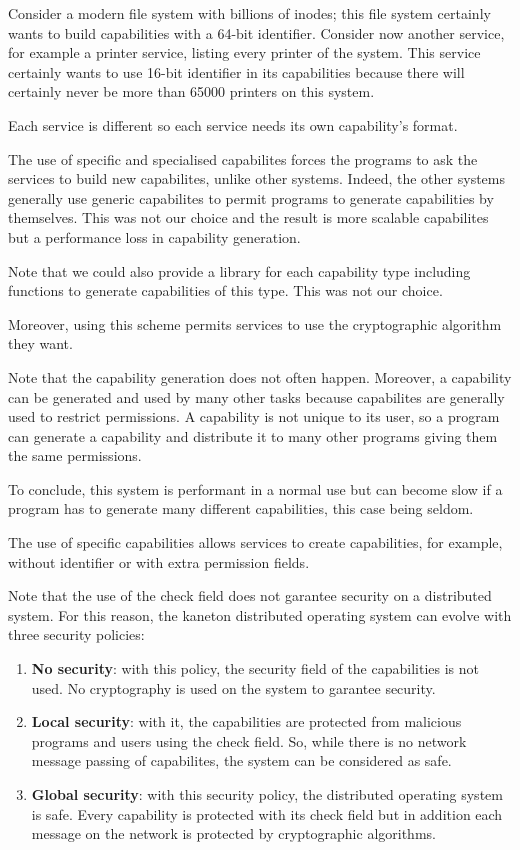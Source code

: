 \begin{multicols}{2}
Consider a modern file system with billions of inodes; this file system
certainly wants to build capabilities with a 64-bit identifier.
Consider now another service, for example a printer service, listing
every printer of the system. This service certainly wants to use 16-bit
identifier in its capabilities because there will certainly never be more than
65000 printers on this system.

Each service is different so each service needs its own capability's format.

The use of specific and specialised capabilites forces the programs to ask
the services to build new capabilites, unlike other systems. Indeed,
the other systems generally use generic capabilites to permit programs to
generate capabilities by themselves. This was not our choice and the result is
more scalable capabilites but a performance loss in capability generation.

Note that we could also provide a library for each capability type including
functions to generate capabilities of this type. This was not our choice.

Moreover, using this scheme permits services to use the cryptographic algorithm
they want.

Note that the capability generation does not often happen. Moreover,
a capability can be generated and used by many other tasks because
capabilites are generally used to restrict permissions. A capability
is not unique to its user, so a program can generate a capability and
distribute it to many other programs giving them the same permissions.

To conclude, this system is performant in a normal use but can become
slow if a program has to generate many different capabilities, this case
being seldom.

The use of specific capabilities allows services to create capabilities,
for example, without identifier or with extra permission fields.

Note that the use of the check field does not garantee security on a
distributed system. For this reason, the kaneton distributed operating
system can evolve with three security policies:

\begin{enumerate}
  \item
    \textbf{No security}: with this policy, the security field of the
    capabilities is not used. No cryptography is used on the system
    to garantee security.
  \item
    \textbf{Local security}: with it, the capabilities are protected from
    malicious programs and users using the check field. So, while there
    is no network message passing of capabilites, the system can be
    considered as safe.
  \item
    \textbf{Global security}: with this security policy, the distributed
    operating system is safe. Every capability is protected with its check
    field but in addition each message on the network is protected by
    cryptographic algorithms.
\end{enumerate}


\end{multicols}
